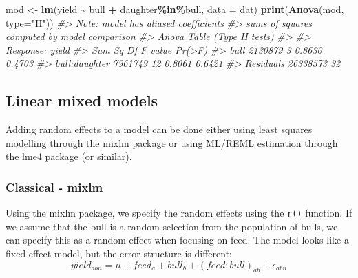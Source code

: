 \documentclass[
]{article}
\newenvironment{Shaded}{\begin{snugshade}}{\end{snugshade}}
\newcommand{\AttributeTok}[1]{\textcolor[rgb]{0.13,0.29,0.53}{#1}}
\newcommand{\CommentTok}[1]{\textcolor[rgb]{0.56,0.35,0.01}{\textit{#1}}}
\newcommand{\FunctionTok}[1]{\textcolor[rgb]{0.13,0.29,0.53}{\textbf{#1}}}
\newcommand{\NormalTok}[1]{#1}
\newcommand{\OtherTok}[1]{\textcolor[rgb]{0.56,0.35,0.01}{#1}}
\newcommand{\SpecialCharTok}[1]{\textcolor[rgb]{0.81,0.36,0.00}{\textbf{#1}}}
\newcommand{\StringTok}[1]{\textcolor[rgb]{0.31,0.60,0.02}{#1}}
\begin{document}
\begin{Shaded}
\begin{Highlighting}[]
\NormalTok{mod }\OtherTok{\textless{}{-}} \FunctionTok{lm}\NormalTok{(yield }\SpecialCharTok{\textasciitilde{}}\NormalTok{ bull }\SpecialCharTok{+}\NormalTok{ daughter}\SpecialCharTok{\%in\%}\NormalTok{bull, }\AttributeTok{data =}\NormalTok{ dat)}
\FunctionTok{print}\NormalTok{(}\FunctionTok{Anova}\NormalTok{(mod, }\AttributeTok{type=}\StringTok{"II"}\NormalTok{))}
\CommentTok{\#\textgreater{} Note: model has aliased coefficients}
\CommentTok{\#\textgreater{}       sums of squares computed by model comparison}
\CommentTok{\#\textgreater{} Anova Table (Type II tests)}
\CommentTok{\#\textgreater{} }
\CommentTok{\#\textgreater{} Response: yield}
\CommentTok{\#\textgreater{}                 Sum Sq Df F value Pr(\textgreater{}F)}
\CommentTok{\#\textgreater{} bull           2130879  3  0.8630 0.4703}
\CommentTok{\#\textgreater{} bull:daughter  7961749 12  0.8061 0.6421}
\CommentTok{\#\textgreater{} Residuals     26338573 32}
\end{Highlighting}
\end{Shaded}

\subsection{Linear mixed models}\label{linear-mixed-models}

Adding random effects to a model can be done either using least squares
modelling through the mixlm package or using ML/REML estimation through
the lme4 package (or similar).

\subsubsection{Classical - mixlm}\label{classical---mixlm}

Using the mixlm package, we specify the random effects using the
\texttt{r()} function. If we assume that the bull is a random selection
from the population of bulls, we can specify this as a random effect
when focusing on feed. The model looks like a fixed effect model, but
the error structure is different:
\[yield_{abn} = \mu + feed_a + bull_b + (feed:bull)_{ab} + \epsilon_{abn}\]
\end{document}
